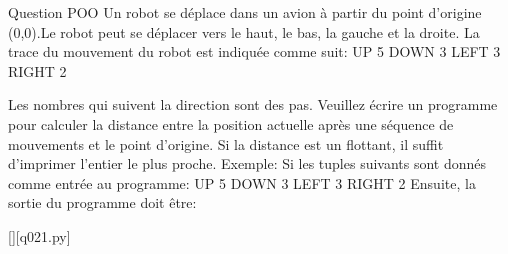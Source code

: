 \question
Question POO
%
\question
Un robot se déplace dans un avion à partir du point d'origine (0,0).Le robot peut se déplacer vers le haut, le bas, la gauche et la droite.\newline
La trace du mouvement du robot est indiquée comme suit:\newline
UP 5\newline
DOWN 3\newline
LEFT 3\newline
RIGHT 2

Les nombres qui suivent la direction sont des pas.\newline
Veuillez écrire un programme pour calculer la distance entre la position actuelle après une séquence de mouvements et le point d'origine. Si la distance est un flottant, il suffit d'imprimer l'entier le plus proche.\newline
Exemple:\newline
Si les tuples suivants sont donnés comme entrée au programme:
UP 5\newline
DOWN 3\newline
LEFT 3\newline
RIGHT 2\newline
Ensuite, la sortie du programme doit être:

\renewcommand{\nomfichier}{q021.py}
\begin{solution}
    \pythonfile{\chemincode \nomfichier}[][\nomfichier]
\end{solution}

